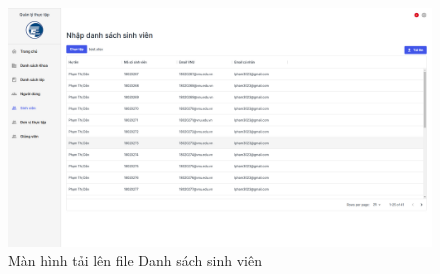 \documentclass[./../main.tex]{subfiles}
\begin{document}
\begin{figure}[]
	\includegraphics[width=\linewidth]{./images/image28.png}
	\caption{Màn hình tải lên file Danh sách sinh viên}
	\label{fig:upload_list}
\end{figure}
\end{document}
